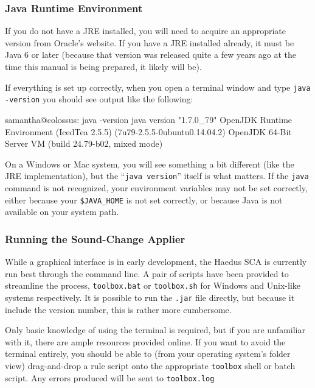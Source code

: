 \documentclass[10pt,letterpaper]{article}
\newcounter{excounter}
\newenvironment{vex}[1]{
  \vspace{1em}
  \refstepcounter{excounter}
  \noindent\makebox[3em][l]{(\arabic{excounter}\label{#1})}
  \minipage{\textwidth}
  \verbatim
}{
  \endverbatim
  \endminipage
  \vspace{1em}
}
\begin{document}

\subsubsection{Java Runtime Environment}
\label{ssub:java_runtime_environment}
If you do not have a JRE installed, you will need to acquire an appropriate version from Oracle's website. If you have a JRE installed already, it must be Java 6 or later (because that version was released quite a few years ago at the time this manual is being prepared, it likely will be).

If everything is set up correctly, when you open a terminal window and type \texttt{java -version} you should see output like the following:

\begin{vex}{ex:javatest}
samantha@colossus: java -version
java version "1.7.0_79"
OpenJDK Runtime Environment (IcedTea 2.5.5) (7u79-2.5.5-0ubuntu0.14.04.2)
OpenJDK 64-Bit Server VM (build 24.79-b02, mixed mode)
\end{vex}

\noindent
On a Windows or Mac system, you will see something a bit different (like the JRE implementation), but the ``\texttt{java version}'' itself is what matters. If the \texttt{java} command is not recognized, your environment variables may not be set correctly, either because your \texttt{\$JAVA\_HOME} is not set correctly, or because Java is not available on your system path.


\subsubsection{Running the Sound-Change Applier}
\label{ssub:running_sca}

While a graphical interface is in early development, the Haedus SCA is currently run best through the command line. A pair of scripts have been provided to streamline the process, \texttt{toolbox.bat} or \texttt{toolbox.sh} for Windows and Unix-like systems respectively. It is possible to run the \texttt{.jar} file directly, but because it include the version number, this is rather more cumbersome.

Only basic knowledge of using the terminal is required, but if you are unfamiliar with it, there are ample resources provided online. If you want to avoid the terminal entirely, you should be able to (from your operating system's folder view) drag-and-drop a rule script onto the appropriate \texttt{toolbox} shell or batch script. Any errors produced will be sent to \texttt{toolbox.log}
\end{document}
